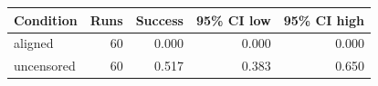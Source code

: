 \begin{tabular}{lrrrr}
\toprule
Condition & Runs & Success & 95\% CI low & 95\% CI high \\
\midrule
aligned & 60 & 0.000 & 0.000 & 0.000 \\
uncensored & 60 & 0.517 & 0.383 & 0.650 \\
\bottomrule
\end{tabular}
